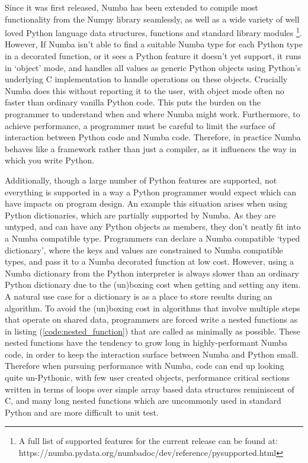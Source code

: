 \documentclass{IEEEcsmag}
\begin{document}
Since it was first released, Numba has been extended to compile most functionality from the Numpy library seamlessly, as well as a wide variety of well loved Python language data structures, functions and standard library modules \footnote{A full list of supported features for the current release can be found at: https://numba.pydata.org/numba\-doc/dev/reference/pysupported.html}. However, If Numba isn't able to find a suitable Numba type for each Python type in a decorated function, or it sees a Python feature it doesn't yet support, it runs in `object' mode, and handles all values as generic Python objects using Python's underlying C implementation to handle operations on these objects. Crucially Numba does this without reporting it to the user, with object mode often no faster than ordinary vanilla Python code. This puts the burden on the programmer to understand when and where Numba might work. Furthermore, to achieve performance, a programmer must be careful to limit the surface of interaction between Python code and Numba code. Therefore, in practice Numba behaves like a framework rather than just a compiler, as it influences the way in which you write Python.

Additionally, though a large number of Python features are supported, not everything is supported in a way a Python programmer would expect which can have impacts on program design. An example this situation arises when using Python dictionaries, which are partially supported by Numba. As they are untyped, and can have any Python objects as members, they don't neatly fit into a Numba compatible type. Programmers can declare a Numba compatible `typed dictionary', where the keys and values are constrained to Numba compatible types, and pass it to a Numba decorated function at low cost. However, using a Numba dictionary from the Python interpreter is always slower than an ordinary Python dictionary due to the (un)boxing cost when getting and setting any item. A natural use case for a dictionary is as a place to store results during an algorithm. To avoid the (un)boxing cost in algorithms that involve multiple steps that operate on shared data, programmers are forced write a nested functions as in listing (\ref{code:nested_function}) that are called as minimally as possible. These nested functions have the tendency to grow long in highly-performant Numba code, in order to keep the interaction surface between Numba and Python small. Therefore when pursuing performance with Numba, code can end up looking quite un-Pythonic, with few user created objects, performance critical sections written in terms of loops over simple array based data structures reminiscent of C, and many long nested functions which are uncommonly used in standard Python and are more difficult to unit test.
\end{document}
